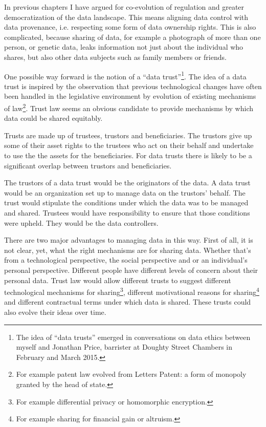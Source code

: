 \documentclass[a4paper]{caesar_book}
\begin{document}
In previous chapters I have argued for co-evolution of regulation and greater democratization of the data landscape. This means aligning data control with data provenance, i.e. respecting some form of data ownership rights. This is also complicated, because sharing of data, for example a photograph of more than one person, or genetic data, leaks information not just about the individual who shares, but also other data subjects such as family members or friends.

One possible way forward is the notion of a ``data trust''\footnote{The idea of ``data trusts'' emerged in conversations on data ethics between myself and Jonathan Price, barrister at Doughty Street Chambers in February and March 2015.}. The idea of a data trust is inspired by the observation that previous technological changes have often been handled in the legislative environment by evolution of existing mechanisms of law\footnote{For example patent law evolved from Letters Patent: a form of monopoly granted by the head of state.}. Trust law seems an obvious candidate to provide mechanisms by which data could be shared equitably.

Trusts are made up of trustees, trustors and beneficiaries. The trustors give up some of their asset rights to the trustees who act on their behalf and undertake to use the the assets for the beneficiaries. For data trusts there is likely to be a significant overlap between trustors and beneficiaries.

The trustors of a data trust would be the originators of the data. A data trust would be an organization set up to manage data on the trustors’ behalf. The trust would stipulate the conditions under which the data was to be managed and shared. Trustees would have responsibility to ensure that those conditions were upheld. They would be the data controllers.

There are two major advantages to managing data in this way. First of all, it is not clear, yet, what the right mechanisms are for sharing data. Whether that’s from a technological perspective, the social perspective and or an individual’s personal perspective. Different people have different levels of concern about their personal data. Trust law would allow different trusts to suggest different technological mechanisms for sharing\footnote{For example differential privacy or homomorphic encryption. }, different motivational reasons for sharing\footnote{For example sharing for financial gain or altruism.} and different contractual terms under which data is shared. These trusts could also evolve their ideas over time.
\end{document}
